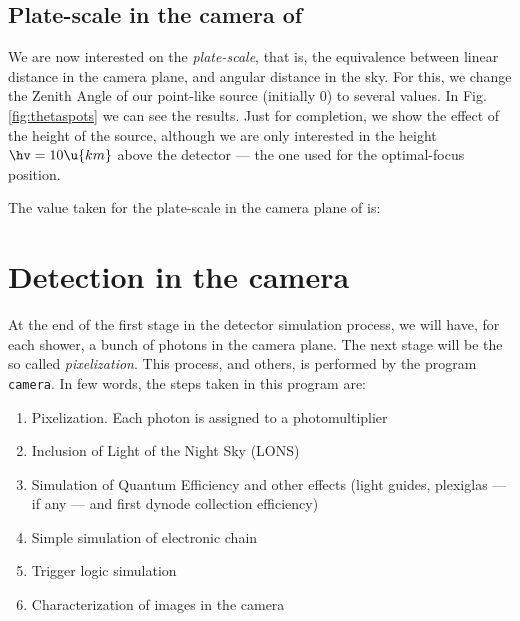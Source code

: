 \subsection{Plate-scale in the camera of \MAGIC}

We are now interested on the \emph{plate-scale}, that is, the
equivalence between linear distance in the camera plane, and angular
distance in the sky. For this, we change the Zenith Angle of our
point-like source (initially 0\deg) to several values. In
Fig.\ref{fig:thetaspots} we can see the results. Just for completion, we
show the effect of the height of the source, although we are only
interested in the height $\hv=10\u{km}$ above the detector --- the one
used for the optimal-focus position.

The value taken for the plate-scale in the camera plane of \MAGIC is:
%
\platescaleeq

\section{Detection in the camera}

At the end of the first stage in the detector simulation process, we
will have, for each shower, a bunch of photons in the camera plane.
The next stage will be the so called \emph{pixelization}.  This
process, and others, is performed by the program \texttt{camera}. In
few words, the steps taken in this program are:

\begin{enumerate}
\item Pixelization. Each photon is assigned to a photomultiplier

\item Inclusion of Light of the Night Sky (LONS)
  
\item Simulation of Quantum Efficiency and other effects (light
  guides, plexiglas --- if any --- and first dynode collection
  efficiency)

\item Simple simulation of electronic chain

\item Trigger logic simulation

\item Characterization of images in the camera
\end{enumerate}

